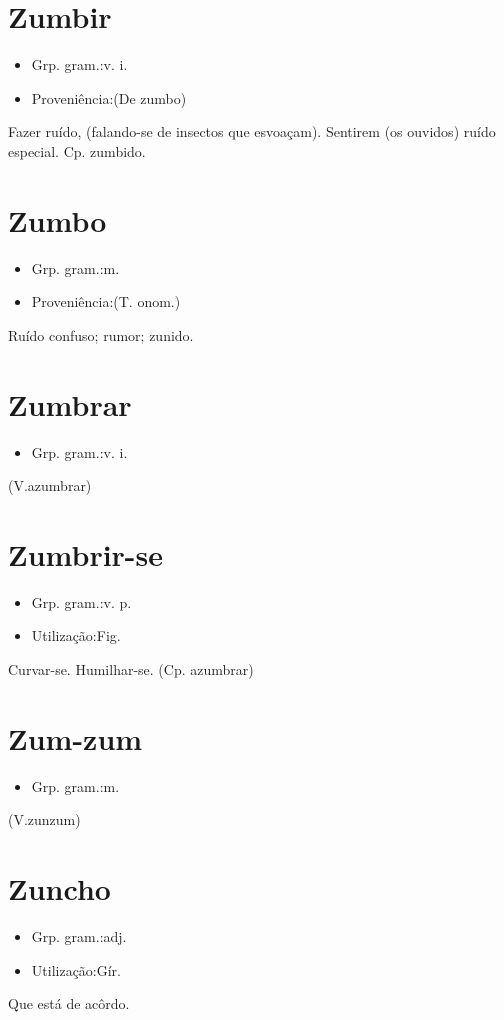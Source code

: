 \section{Zumbir}
\begin{itemize}
\item {Grp. gram.:v. i.}
\end{itemize}
\begin{itemize}
\item {Proveniência:(De \textunderscore zumbo\textunderscore )}
\end{itemize}
Fazer ruído, (falando-se de insectos que esvoaçam).
Sentirem (os ouvidos) ruído especial.
Cp. \textunderscore zumbido\textunderscore .
\section{Zumbo}
\begin{itemize}
\item {Grp. gram.:m.}
\end{itemize}
\begin{itemize}
\item {Proveniência:(T. onom.)}
\end{itemize}
Ruído confuso; rumor; zunido.
\section{Zumbrar}
\begin{itemize}
\item {Grp. gram.:v. i.}
\end{itemize}
(V.azumbrar)
\section{Zumbrir-se}
\begin{itemize}
\item {Grp. gram.:v. p.}
\end{itemize}
\begin{itemize}
\item {Utilização:Fig.}
\end{itemize}
Curvar-se.
Humilhar-se.
(Cp. \textunderscore azumbrar\textunderscore )
\section{Zum-zum}
\begin{itemize}
\item {Grp. gram.:m.}
\end{itemize}
(V.zunzum)
\section{Zuncho}
\begin{itemize}
\item {Grp. gram.:adj.}
\end{itemize}
\begin{itemize}
\item {Utilização:Gír.}
\end{itemize}
Que está de acôrdo.
